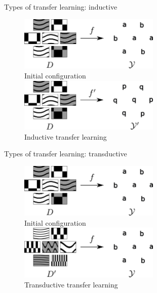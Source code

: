 \documentclass[xcolor=pdftex,dvipsnames,table,mathserif]{beamer}
\begin{document}
\begin{frame}{Types of transfer learning: inductive}

\begin{figure}[ht]
  \centering
  \includegraphics[width=0.6\textwidth]{tl_0}\\
  Initial configuration\\
  \vspace{2em}
  \includegraphics[width=0.6\textwidth]{tl_inductive}\\
  Inductive transfer learning
\end{figure}


\end{frame}


\begin{frame}{Types of transfer learning: transductive}

\begin{figure}[ht]
  \centering
  \includegraphics[width=0.6\textwidth]{tl_0}\\
  Initial configuration\\
  \vspace{2em}
  \includegraphics[width=0.6\textwidth]{tl_transductive}\\
  Transductive transfer learning
\end{figure}

\end{frame}
\end{document}
